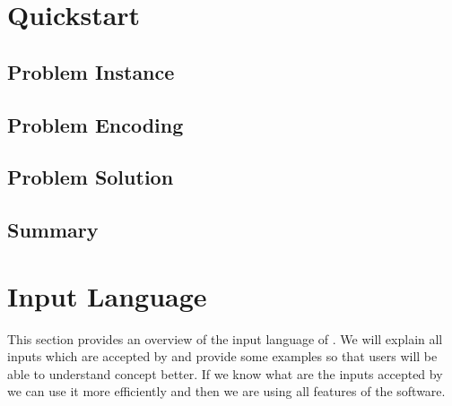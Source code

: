 \documentclass[14pt,a4paper, titlepage]{article}
\begin{document}
\newpage
\section{Quickstart} %
\subsection{Problem Instance}
\subsection{Problem Encoding}
\subsection{Problem Solution}
\subsection{Summary}

\newpage
\section{Input Language}%
This section provides an overview of the input language of \dlvhex{}. We will explain all inputs which are accepted by \dlvhex{} and provide some examples so that users will be able to understand concept better. If we know what are the inputs accepted by \dlvhex{} we can use it more efficiently and then we are using all features of the software.  
\end{document}
